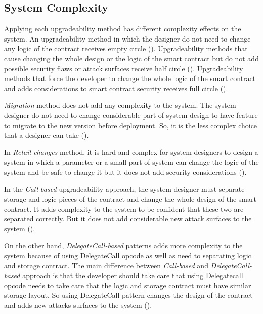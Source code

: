  \subsection{System Complexity}
 Applying each upgradeability method has different complexity effects on the system. An upgradeability method in which the designer do not need to change any logic of the contract receives empty circle (\Circle). Upgradeability methods that cause changing the whole design or the logic of the smart contract but do not add possible security flaws or attack surfaces receive half circle (\LEFTcircle). Upgradeability methods that force the developer to change the whole logic of the smart contract and adds considerations to smart contract security receives full circle (\CIRCLE).

 \textit{Migration} method does not add any complexity to the system. The system designer do not need to change considerable part of system design to have feature to migrate to the new version before deployment. So, it is the less complex choice that a designer can take (\Circle).
 
 In \textit{Retail changes} method, it is hard and complex for system designers to design a system in which a parameter or a small part of system can change the logic of the system and be safe to change it but it does not add security considerations (\LEFTcircle).
 
 In the \textit{Call-based} upgradeability approach, the system designer must separate storage and logic pieces of the contract and change the whole design of the smart contract. It adds complexity to the system to be confident that these two are separated correctly. But it does not add considerable new attack surfaces to the system (\LEFTcircle).
 
 
 On the other hand, \textit{DelegateCall-based} patterns adds more complexity to the system because of using DelegateCall opcode as well as need to separating logic and storage contract. The main difference between \textit{Call-based} and \textit{DelegateCall-based} approach is that the developer should take care that using Delegatecall opcode needs to take care that the logic and storage contract must have similar storage layout. So using DelegateCall pattern changes the design of the contract and adds new attacks surfaces to the system (\CIRCLE).

